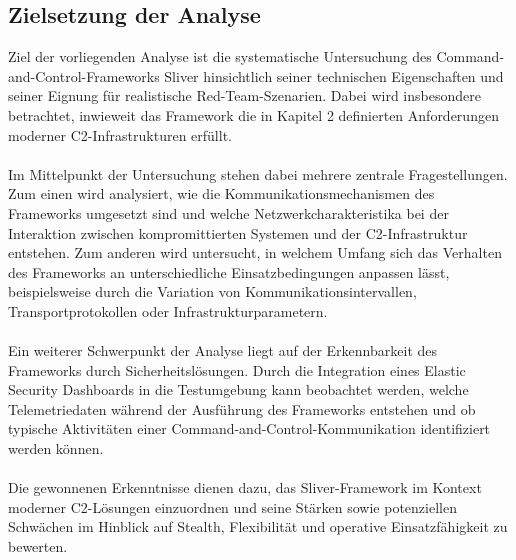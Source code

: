 \subsection{Zielsetzung der Analyse}
Ziel der vorliegenden Analyse ist die systematische Untersuchung des Command-and-Control-Frameworks Sliver hinsichtlich seiner technischen Eigenschaften und seiner Eignung für realistische Red-Team-Szenarien. Dabei wird insbesondere betrachtet, inwieweit das Framework die in Kapitel 2 definierten Anforderungen moderner C2-Infrastrukturen erfüllt.
\\\\
Im Mittelpunkt der Untersuchung stehen dabei mehrere zentrale Fragestellungen. Zum einen wird analysiert, wie die Kommunikationsmechanismen des Frameworks umgesetzt sind und welche Netzwerkcharakteristika bei der Interaktion zwischen kompromittierten Systemen und der C2-Infrastruktur entstehen. Zum anderen wird untersucht, in welchem Umfang sich das Verhalten des Frameworks an unterschiedliche Einsatzbedingungen anpassen lässt, beispielsweise durch die Variation von Kommunikationsintervallen, Transportprotokollen oder Infrastrukturparametern.
\\\\
Ein weiterer Schwerpunkt der Analyse liegt auf der Erkennbarkeit des Frameworks durch Sicherheitslösungen. Durch die Integration eines Elastic Security Dashboards in die Testumgebung kann beobachtet werden, welche Telemetriedaten während der Ausführung des Frameworks entstehen und ob typische Aktivitäten einer Command-and-Control-Kommunikation identifiziert werden können.
\\\\
Die gewonnenen Erkenntnisse dienen dazu, das Sliver-Framework im Kontext moderner C2-Lösungen einzuordnen und seine Stärken sowie potenziellen Schwächen im Hinblick auf Stealth, Flexibilität und operative Einsatzfähigkeit zu bewerten.
